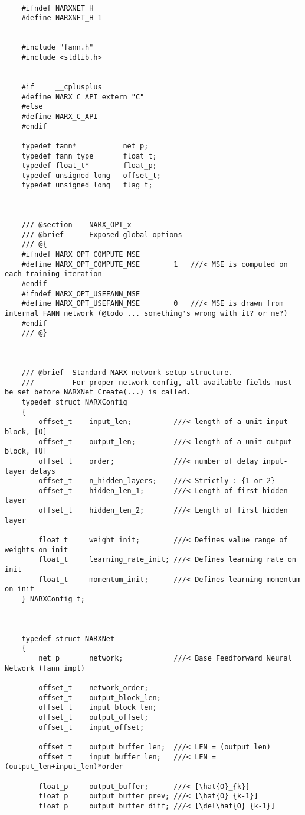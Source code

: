\begin{lstlisting}

	#ifndef NARXNET_H
	#define NARXNET_H 1


	#include "fann.h"
	#include <stdlib.h>


	#if		__cplusplus
	#define NARX_C_API extern "C"
	#else
	#define NARX_C_API
	#endif

	typedef fann*			net_p;
	typedef fann_type		float_t;
	typedef float_t*		float_p;
	typedef unsigned long	offset_t;
	typedef unsigned long 	flag_t;



	/// @section	NARX_OPT_x
	/// @brief		Exposed global options
	/// @{
	#ifndef NARX_OPT_COMPUTE_MSE
	#define NARX_OPT_COMPUTE_MSE		1	///< MSE is computed on each training iteration
	#endif
	#ifndef NARX_OPT_USEFANN_MSE
	#define NARX_OPT_USEFANN_MSE		0	///< MSE is drawn from internal FANN network (@todo ... something's wrong with it? or me?)
	#endif
	/// @}



	/// @brief	Standard NARX network setup structure.
	///			For proper network config, all available fields must be set before NARXNet_Create(...) is called.
	typedef struct NARXConfig
	{
		offset_t	input_len;			///< length of a unit-input block, [O]
		offset_t	output_len;			///< length of a unit-output block, [U]
		offset_t	order;				///< number of delay input-layer delays
		offset_t	n_hidden_layers;	///< Strictly : {1 or 2}
		offset_t	hidden_len_1;		///< Length of first hidden layer
		offset_t	hidden_len_2;		///< Length of first hidden layer

		float_t		weight_init;		///< Defines value range of weights on init
		float_t		learning_rate_init;	///< Defines learning rate on init
		float_t		momentum_init;		///< Defines learning momentum on init
	} NARXConfig_t;



	typedef struct NARXNet
	{
		net_p		network;			///< Base Feedforward Neural Network (fann impl)

		offset_t	network_order;
		offset_t	output_block_len;
		offset_t	input_block_len;
		offset_t	output_offset;
		offset_t	input_offset;

		offset_t	output_buffer_len;	///< LEN = (output_len)					
		offset_t	input_buffer_len;	///< LEN = (output_len+input_len)*order

		float_p		output_buffer;		///< [\hat{O}_{k}]
		float_p		output_buffer_prev;	///< [\hat{O}_{k-1}]
		float_p		output_buffer_diff;	///< [\del\hat{O}_{k-1}]


\end{lstlisting}
